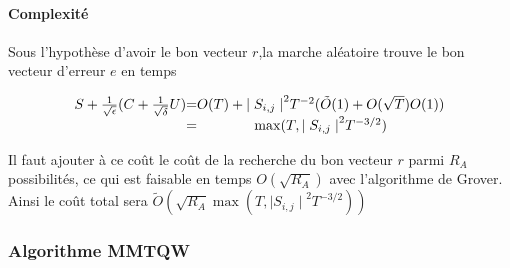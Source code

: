 \documentclass[12pt,openany]{report}
\begin{document}
\paragraph{Complexité} Sous l'hypothèse d'avoir le bon vecteur $r$,la marche aléatoire trouve le bon vecteur d'erreur $e$ en temps \cite{Ghazal}
\begin{center}

\[
\left.
\begin{array}{c @{=} c}
S + \frac{1}{\sqrt{\epsilon}}(C+\frac{1}{\sqrt{\delta}}U) & O(T)+ {\mid S_{i,j} \mid}^{2}T^{-2}(\tilde{O}(1)+O(\sqrt{T})O(1))  \\
& \max(T,{\mid S_{i,j} \mid}^2T^{-3/2})
   
   
   
\end{array}
\right.
\]

\end{center}
Il faut ajouter à ce coût le coût de la recherche du bon vecteur $r$ parmi $R_A  $ possibilités, ce qui est faisable en temps $O(\sqrt{R_A}) $ avec l'algorithme de Grover. Ainsi le coût total sera $\tilde{O}(\sqrt{R_A}\max(T,{\mid S_{i,j} \mid}^2T^{-3/2}))  $

\subsubsection{Algorithme MMTQW}
\end{document}
